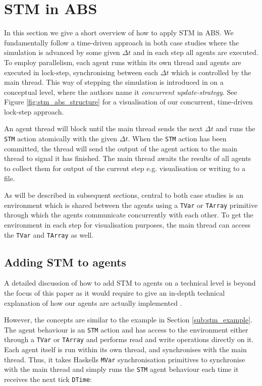 \section{STM in ABS}
\label{sec:stm_abs}
In this section we give a short overview of how to apply STM in ABS. We fundamentally follow a time-driven approach in both case studies where the simulation is advanced by some given $\Delta t$ and in each step all agents are executed. To employ parallelism, each agent runs within its own thread and agents are executed in lock-step, synchronising between each $\Delta t$ which is controlled by the main thread. This way of stepping the simulation is introduced in \cite{thaler_art_2017} on a conceptual level, where the authors name it \textit{concurrent update-strategy}. See Figure \ref{fig:stm_abs_structure} for a visualisation of our concurrent, time-driven lock-step approach. 

An agent thread will block until the main thread sends the next $\Delta t$ and runs the \texttt{STM} action atomically with the given $\Delta t$. When the \texttt{STM} action has been committed, the thread will send the output of the agent action to the main thread to signal it has finished. The main thread awaits the results of all agents to collect them for output of the current step e.g. visualisation or writing to a file.

As will be described in subsequent sections, central to both case studies is an environment which is shared between the agents using a \texttt{TVar} or \texttt{TArray} primitive through which the agents communicate concurrently with each other. To get the environment in each step for visualisation purposes, the main thread can access the \texttt{TVar} and \texttt{TArray} as well. 

\subsection{Adding STM to agents}
A detailed discussion of how to add STM to agents on a technical level is beyond the focus of this paper as it would require to give an in-depth technical explanation of how our agents are actually implemented \cite{thaler_pure_2018}.

However, the concepts are similar to the example in Section \ref{sub:stm_example}. The agent behaviour is an \texttt{STM} action and has access to the environment either through a \texttt{TVar} or \texttt{TArray} and performs read and write operations directly on it. Each agent itself is run within its own thread, and synchronises with the main thread. Thus, it takes Haskells \texttt{MVar} synchronisation primitives to synchronise with the main thread and simply runs the \texttt{STM} agent behaviour each time it receives the next tick \texttt{DTime}:


